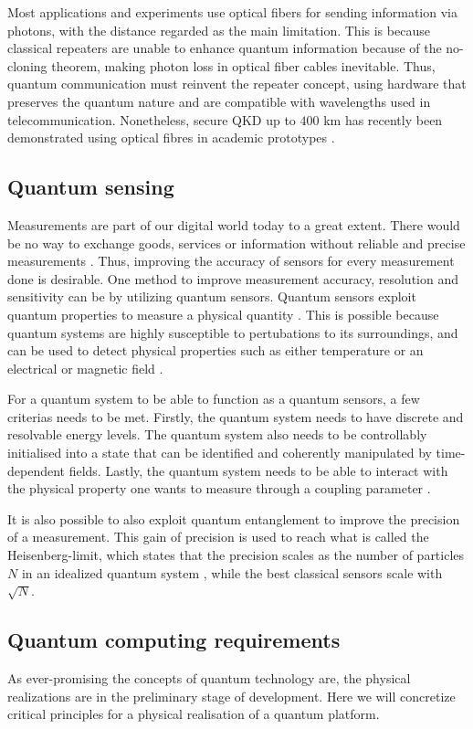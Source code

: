 Most applications and experiments use optical fibers for sending information via photons, with the distance regarded as the main limitation. This is because classical repeaters are unable to enhance quantum information because of the no-cloning theorem, making photon loss in optical fiber cables inevitable. Thus, quantum communication must reinvent the repeater concept, using hardware that preserves the quantum nature \cite{Acin2018} and are compatible with wavelengths used in telecommunication. Nonetheless, secure QKD up to $400$ km has recently been demonstrated using optical fibres in academic prototypes \cite{Boaron2018}.

\subsection{Quantum sensing}

Measurements are part of our digital world today to a great extent. There would be no way to exchange goods, services or information without reliable and precise measurements \cite{Acin2018}. Thus, improving the accuracy of sensors for every measurement done is desirable. One method to improve measurement accuracy, resolution and sensitivity can be by utilizing quantum sensors. Quantum sensors exploit quantum properties to measure a physical quantity \cite{Degen2017}. This is possible because quantum systems are highly susceptible to pertubations to its surroundings, and can be used to detect physical properties such as either temperature or an electrical or magnetic field \cite{Degen2017}.

For a quantum system to be able to function as a quantum sensors, a few criterias needs to be met.  Firstly, the quantum system needs to have discrete and resolvable energy levels. The quantum system also needs to be controllably initialised into a state that can be identified and coherently manipulated by time-dependent fields. Lastly, the quantum system needs to be able to interact with the physical property one wants to measure through a coupling parameter \cite{Degen2017}.

It is also possible to also exploit quantum entanglement to improve the precision of a measurement. This gain of precision is used to reach what is called the Heisenberg-limit, which states that the precision scales as the number of particles $N$ in an idealized quantum system \cite{Degen2017, Acin2018}, while the best classical sensors scale with $\sqrt{N}$.


\subsection{Quantum computing requirements}
As ever-promising the concepts of quantum technology are, the physical realizations are in the preliminary stage of development. Here we will concretize critical principles for a physical realisation of a quantum platform.

